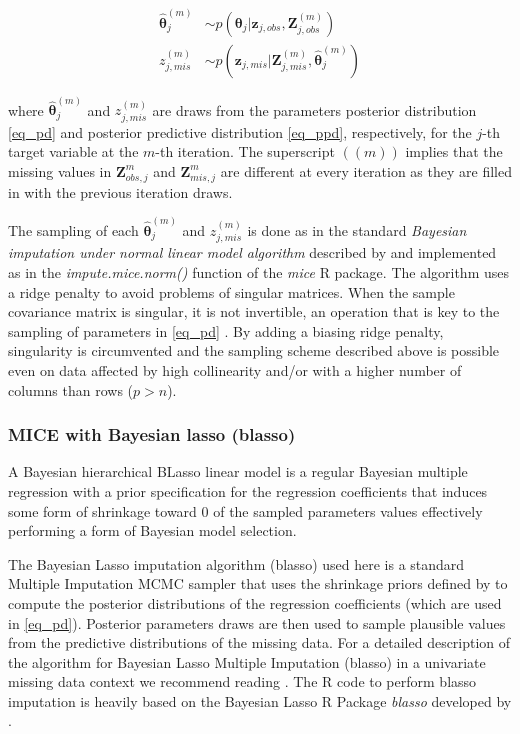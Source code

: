 	\begin{align}
	\hat{\bm{\theta}}_{j}^{(m)} &\sim p(\bm{\theta}_j | \bm{z}_{j, obs}, \bm{Z}_{j, obs}^{(m)}) \label{eq_pd}\\
	z_{j, mis}^{(m)} &\sim p(\bm{z}_{j, mis} | \bm{Z}_{j, mis}^{(m)}, \hat{\bm{\theta}}_{j}^{(m)}) \label{eq_ppd}
	\end{align}

	where $\hat{\bm{\theta}}_{j}^{(m)}$ and $z_{j, mis}^{(m)}$ are draws from the parameters posterior distribution 
	\eqref{eq_pd} and posterior predictive distribution \eqref{eq_ppd}, respectively, for the $j$-th target variable 
	at the $m$-th iteration. The superscript $((m))$ implies that the missing values in $\bm{Z}_{obs, j}^{m}$
	and $\bm{Z}_{mis, j}^{m}$ are different at every iteration as they are filled in with the previous iteration 
	draws.

	The sampling of each $\hat{\bm{\theta}}_{j}^{(m)}$ and $z_{j, mis}^{(m)}$ is done as in the standard 
	\emph{Bayesian imputation under normal linear model algorithm} described by 
	\citep[p. 68, algorithm 3.1]{vanBuuren:2012} and implemented as in the \emph{impute.mice.norm()} 
	function of the \emph{mice} R package.
	The algorithm uses a ridge penalty to avoid problems of singular matrices.
	When the sample covariance matrix is singular, it is not invertible, an operation that
	is key to the sampling of parameters in \eqref{eq_pd} \citep{schafer:1997}.
	By adding a biasing ridge penalty, singularity is circumvented and the sampling scheme described above is 
	possible even on data affected by high collinearity and/or with a higher number of columns than rows
	($p > n$).

\subsubsection{MICE with Bayesian lasso (blasso)}
	A Bayesian hierarchical BLasso linear model is a regular Bayesian multiple regression with a
	prior specification for the regression coefficients that induces some form of shrinkage toward 0 of
	the sampled parameters values \citep{parkCasella:2008, hans:2009} effectively performing a form of 
	Bayesian model selection.

	The Bayesian Lasso imputation algorithm (blasso) used here is a standard Multiple Imputation MCMC sampler 
	that uses the shrinkage priors defined by \citet{hans:2010} to compute the posterior distributions of the 
	regression coefficients (which are used in \eqref{eq_pd}). 
	Posterior parameters draws are then used to sample plausible values from the predictive distributions of 
	the missing data.
	For a detailed description of the algorithm for Bayesian Lasso Multiple Imputation (blasso) in a univariate
	missing data context we recommend reading \cite{zhaoLong:2016}.
	The R code to perform blasso imputation is heavily based on the Bayesian Lasso R Package \emph{blasso} 
	developed by \citet{hans:2010}.

